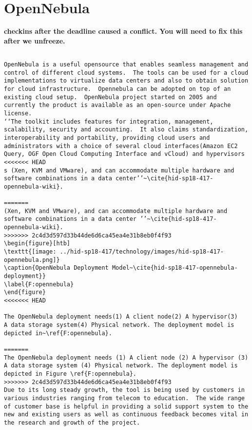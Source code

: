 
\section{OpenNebula}

{\bf checkins after the deadline caused a conflict. You will need to
  fix this after we unfreeze.}

\begin{verbatim}

OpenNebula is a useful opensource that enables seamless management and
control of different cloud systems.  The tools can be used for a cloud
implementations to virtualize data centers and also to obtain solution
for cloud infrastructure.  Opennebula can be adopted on top of an
existing cloud setup.  OpenNebula project started on 2005 and
currently the product is available as an open-source under Apache
license.
‘‘The toolkit includes features for integration, management,
scalability, security and accounting.  It also claims standardization,
interoperability and portability, providing cloud users and
administrators with a choice of several cloud interfaces(Amazon EC2
Query, OGF Open Cloud Computing Interface and vCloud) and hypervisors
<<<<<<< HEAD
s (Xen, KVM and VMware), and can accommodate multiple hardware and
software combinations in a data center’’~\cite{hid-sp18-417-opennebula-wiki}.

=======
(Xen, KVM and VMware), and can accommodate multiple hardware and
software combinations in a data center ’’~\cite{hid-sp18-417-opennebula-wiki}.
>>>>>>> 2c4d3d597d33b44de6d6ca45ea4e31b8eb0f4f93
\begin{figure}[htb]
\texttt{[image: ../hid-sp18-417/technology/images/hid-sp18-417-opennebula.png]}
\caption{OpenNebula Deployment Model~\cite{hid-sp18-417-opennebula-deployment}} 
\label{F:opennebula}
\end{figure}
<<<<<<< HEAD

The OpenNebula deployment needs(1) A client node(2) A hypervisor(3)
A data storage system(4) Physical network. The deployment model is
depicted in~\ref{F:opennebula}.

=======
The OpenNebula deployment needs (1) A client node (2) A hypervisor (3)
A data storage system (4) Physical network. The deployment model is
depicted in Figure \ref{F:opennebula}.
>>>>>>> 2c4d3d597d33b44de6d6ca45ea4e31b8eb0f4f93
Due to its long steady growth, the tool is being used by customers in
various industries ranging from telecom to education.  The wide range
of customer base is helpful in providing a solid support system to the
new and existing users as well as continuous feedback becomes vital in
the research and growth of the project.

\end{verbatim}